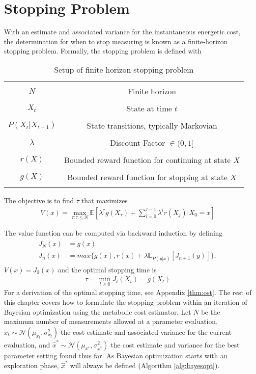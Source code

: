 \section{Stopping Problem}
With an estimate and associated variance for the instantaneous energetic cost, the determination for when to stop measuring is known as a finite-horizon stopping problem. Formally, the stopping problem is defined with

\begin{table}[h]
\centering
\begin{tabular}{ |c  c| }
  \hline&\\
  $N$ & Finite horizon\\
  &\\
  $X_t$ & State at time $t$\\
  &\\
  $P(X_t \vert X_{t-1})$ & State transitions, typically Markovian\\
  &\\
  $\lambda$ & Discount Factor $\in (0, 1]$\\
  &\\
  $r(X)$ & Bounded reward function for continuing at state $X$\\
  &\\
  $g(X)$ & Bounded reward function for stopping at state $X$\\
  &\\
  \hline
\end{tabular}
\caption{Setup of finite horizon stopping problem}
\label{tab:stopping}
\end{table}

The objective is to find $\tau$ that maximizes
\begin{align}
  V(x) = \max_{\tau: \tau \leq N} \mathbb{E}[\lambda^{\tau} g(X_{\tau}) + \sum_{i=0}^{\tau-1} \lambda^{i}r(X_j) \vert X_0 = x]
\end{align}

The value function can be computed via backward induction by defining
\begin{align}
\begin{split}
  J_N(x) &= g(x)\\
  J_n(x) &= max\{g(x), r(x) + \lambda\mathbb{E}_{P(y\vert x)}[J_{n+1}(y)]\},
\end{split}
\end{align}
$V(x) = J_0(x)$ and the optimal stopping time is
\begin{align}
  \tau = \min_{t \geq 0}J_t(X_t) = g(X_t)
\end{align}
For a derivation of the optimal stopping time, see Appendix \ref{thm:ost}. The rest of this chapter covers how to formulate the stopping problem within an iteration of Bayesian optimization using the metabolic cost estimator. Let $N$ be the maximum number of measurements allowed at a parameter evaluation, $\hat{x}_t \sim \mathcal{N}(\mu_{x_t}, \sigma^2_{x_t})$ the cost estimate and associated variance for the current evaluation, and $\hat{x}^* \sim \mathcal{N}(\mu_{x^*}, \sigma^2_{x^*})$ the cost estimate and variance for the best parameter setting found thus far. As Bayesian optimization starts with an exploration phase, $\hat{x}^*$ will always be defined (Algorithm \ref{alg:bayesopt}).

